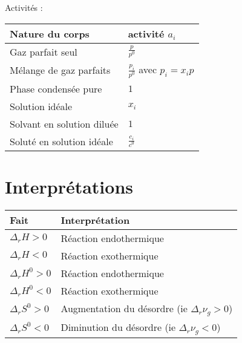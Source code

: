 \documentclass[12pt,a4paper] {article}
\begin{document}
Activités : \\
\begin{center}\begin{tabular}{|l|l|} \hline
    \bf{Nature du corps} & \bf{activité $a_i$} \\ \hline
    Gaz parfait seul & $\frac{p}{p^0}$ \\ \hline
    Mélange de gaz parfaits & $\frac{p_i}{p^0}$ avec $p_i = x_ip$ \\ \hline
    Phase condensée pure & $1$ \\ \hline
    Solution idéale & $x_i$ \\ \hline
    Solvant en solution diluée & $1$ \\ \hline
    Soluté en solution idéale & $\frac{c_i}{c^0}$ \\ \hline
\end{tabular}\end{center}

\section{Interprétations}
\begin{tabularx}{\linewidth}{|l|X|} \hline
    \bf{Fait} & \bf{Interprétation} \\ \hline
    $\Delta_r H > 0$ & Réaction endothermique \\ \hline
    $\Delta_r H < 0$ & Réaction exothermique \\ \hline
    $\Delta_r H^0 > 0$ & Réaction endothermique \\ \hline
    $\Delta_r H^0 < 0$ & Réaction exothermique \\ \hline
    $\Delta_r S^0 > 0$ & Augmentation du désordre (ie $\Delta_r \nu_g > 0$) \\ \hline
    $\Delta_r S^0 < 0$ & Diminution du désordre (ie $\Delta_r \nu_g < 0$) \\ \hline
\end{tabularx}
\end{document}
